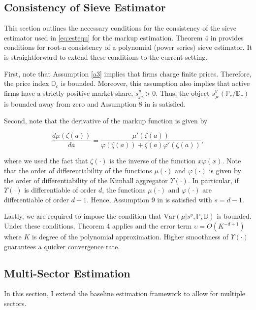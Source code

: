 \subsection{Consistency of Sieve Estimator}\label{a:mucons}
This section outlines the necessary conditions for the consistency of the sieve estimator used in \eqref{eq:estequ} for the markup estimation. Theorem 4 in \textcite{Newey97} provides conditions for root-n consistency of a polynomial (power series) sieve estimator. It is straightforward to extend these conditions to the current setting. 

First, note that Assumption \ref{a3} implies that firms charge finite prices. Therefore, the price index $\mathbb{D}_c$ is bounded. Moreover, this assumption also implies that active firms have a strictly positive market share, $s^y_{jc} > 0$. Thus, the object $s_{jc}^y \left(\mathbb{P}_c/\mathbb{D}_c\right)$ is bounded away from zero and Assumption 8 in \textcite{Newey97} is satisfied. 

Second, note that the derivative of the markup function is given by

\begin{equation*}
	\frac{d \mu(\zeta(a))}{d a} = \frac{\mu'(\zeta(a))}{\varphi(\zeta(a)) + \zeta(a) \varphi'(\zeta(a))},
\end{equation*}

where we used the fact that $\zeta(\cdot)$ is the inverse of the function $x \varphi(x)$. Note that the order of differentiability of the functions $\mu(\cdot)$ and $\varphi(\cdot)$ is given by the order of differentiability of the Kimball aggregator $\Upsilon(\cdot)$. In particular, if $\Upsilon(\cdot)$ is differentiable of order $d$, the functions $\mu(\cdot)$ and $\varphi(\cdot)$ are differentiable of order $d-1$. Hence, Assumption 9 in \textcite{Newey97} is satisfied with $s = d-1$. 

Lastly, we are required to impose the condition that $\text{Var}(\mu| s^y, \mathbb{P}, \mathbb{D})$ is bounded. Under these conditions, Theorem 4 applies and the error term $\upsilon = O(K^{-d + 1})$ where $K$ is degree of the polynomial approximation. Higher smoothness of $\Upsilon(\cdot)$ guarantees a quicker convergence rate. 



\subsection{Multi-Sector Estimation}\label{a:muext}
In this section, I extend the baseline estimation framework to allow for multiple sectors.

